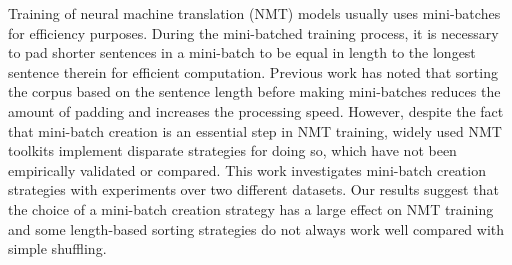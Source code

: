 Training of neural machine translation (NMT) models usually uses mini-batches for efficiency purposes. During the mini-batched training process, it is necessary to pad shorter sentences in a mini-batch to be equal in length to the longest sentence therein for efficient computation. Previous work has noted that sorting the corpus based on the sentence length before making mini-batches reduces the amount of padding and increases the processing speed. However, despite the fact that mini-batch creation is an essential step in NMT training, widely used NMT toolkits implement disparate strategies for doing so, which have not been empirically validated or compared. This work investigates mini-batch creation strategies with experiments over two different datasets. Our results suggest that the choice of a mini-batch creation strategy has a large effect on NMT training and some length-based sorting strategies do not always work well compared with simple shuffling.
